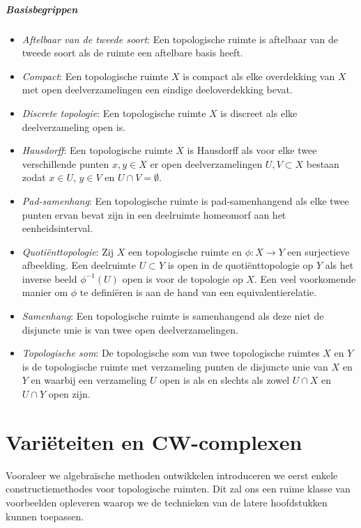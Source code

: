 \documentclass[12pt]{book}
\begin{document}
\paragraph{Basisbegrippen}
\begin{itemize}
\item \emph{Aftelbaar van de tweede soort}: Een topologische ruimte is aftelbaar van de tweede soort als de ruimte een aftelbare basis heeft.
\item \emph{Compact}: Een topologische ruimte $X$  is compact als elke overdekking van $X$ met open deelverzamelingen een eindige deeloverdekking bevat. 
\item \emph{Discrete topologie}: Een topologische ruimte $X$ is discreet als elke deelverzameling open is. 
\item \emph{Hausdorff}: Een topologische ruimte $X$ is Hausdorff als voor elke twee verschillende punten $x, y \in X$ er open deelverzamelingen $U,V \subset X$ bestaan zodat $x \in U$, $y \in V$ en $U \cap V = \emptyset$.
\item \emph{Pad-samenhang}: Een topologische ruimte is pad-samenhangend als elke twee punten ervan bevat zijn in een deelruimte homeomorf aan het eenheidsinterval.
\item \emph{Quoti\"enttopologie}: Zij $X$ een topologische ruimte en $\phi: X \to Y$ een surjectieve afbeelding. Een deelruimte $U \subset Y$ is open in de quoti\"enttopologie op $Y$ als het inverse beeld $\phi^{-1}(U)$ open is voor de topologie op $X$. Een veel voorkomende manier om $\phi$ te defini\"eren is aan de hand van een equivalentierelatie.
\item \emph{Samenhang}: Een topologische ruimte is samenhangend als deze niet de disjuncte unie is van twee open deelverzamelingen.
\item \emph{Topologische som}: De topologische som van twee topologische ruimtes $X$ en $Y$ is de topologische ruimte met verzameling punten de disjuncte unie van $X$ en $Y$ en waarbij een verzameling $U$ open is als en slechts als zowel $U \cap X$ en $U \cap Y$ open zijn.
\end{itemize}


\chapter{Vari\"eteiten en CW-complexen}
Vooraleer we algebra\"ische methoden ontwikkelen introduceren we eerst enkele constructiemethodes voor topologische ruimten. Dit zal ons een ruime klasse van voorbeelden opleveren waarop we de technieken van de latere hoofdstukken kunnen toepassen.
\end{document}
